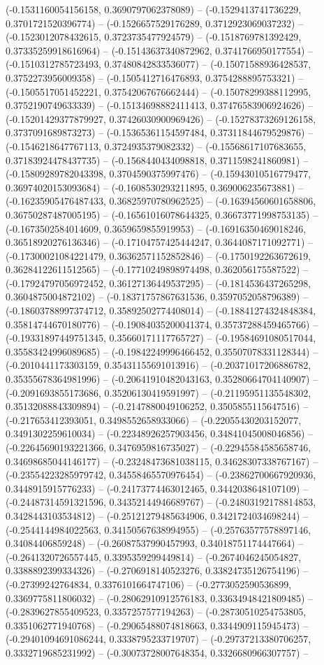 (-0.1531160054156158, 0.3690797062378089) -- (-0.1529413741736229, 0.3701721520396774) -- (-0.1526657529176289, 0.3712923069037232) -- (-0.1523012078432615, 0.3723735477924579) -- (-0.1518769781392429, 0.37335259918616964) -- (-0.15143637340872962, 0.3741766950177554) -- (-0.1510312785723493, 0.37480842833536077) -- (-0.15071588936428537, 0.3752273956009358) -- (-0.1505412716476893, 0.3754288895753321) -- (-0.1505517051452221, 0.37542067676662444) -- (-0.15078299388112995, 0.3752190749633339) -- (-0.15134698882411413, 0.37476583906924626) -- (-0.15201429377879927, 0.37426030900969426) -- (-0.15278373269126158, 0.3737091689873273) -- (-0.15365361154597484, 0.37311844679529876) -- (-0.1546218647767113, 0.3724935379082332) -- (-0.15568617107683655, 0.37183924478437735) -- (-0.1568440434098818, 0.3711598241860981) -- (-0.15809289782043398, 0.3704590375997476) -- (-0.15943010516779477, 0.36974020153093684) -- (-0.1608530293211895, 0.369006235673881) -- (-0.16235905476487433, 0.36825970780962525) -- (-0.16394560601658806, 0.36750287487005195) -- (-0.16561016078644325, 0.36673771998753135) -- (-0.1673502584014609, 0.3659659855919953) -- (-0.16916350469018246, 0.36518920276136346) -- (-0.17104757425444247, 0.3644087171092771) -- (-0.17300021084221479, 0.36362571152852846) -- (-0.1750192263672619, 0.36284122611512565) -- (-0.17710249898974498, 0.362056175587522) -- (-0.17924797056972452, 0.36127136449537295) -- (-0.1814536437265298, 0.3604875004872102) -- (-0.18371757867631536, 0.3597052058796389) -- (-0.18603788997374712, 0.35892502774408014) -- (-0.18841274324848384, 0.35814744670180776) -- (-0.19084035200041374, 0.35737288459465766) -- (-0.19331897449751345, 0.35660171117765727) -- (-0.19584691080517044, 0.35583424996089685) -- (-0.19842249996466452, 0.35507078331128344) -- (-0.2010441173303159, 0.35431155691013916) -- (-0.20371017206886782, 0.35355678364981996) -- (-0.20641910482043163, 0.35280664704140907) -- (-0.2091693855173686, 0.35206130419591997) -- (-0.21195951135548302, 0.35132088843309894) -- (-0.2147880049106252, 0.3505855115647516) -- (-0.217653412393051, 0.3498552658933066) -- (-0.22055430203152077, 0.3491302259610034) -- (-0.22348926257903456, 0.34841045008046856) -- (-0.22645690193221366, 0.3476959816735027) -- (-0.22945584585658746, 0.34698685044146177) -- (-0.23248473681038115, 0.34628307338767167) -- (-0.23554223285979742, 0.34558465570976454) -- (-0.23862700667920936, 0.3448915915776233) -- (-0.24173774463012465, 0.3442038648107109) -- (-0.24487314591321596, 0.34352144946689767) -- (-0.24803192178814853, 0.3428443103534812) -- (-0.25121279485634906, 0.3421724034698244) -- (-0.2544144984022563, 0.34150567638994955) -- (-0.25763577578897146, 0.34084406859248) -- (-0.26087537990457993, 0.34018751174447664) -- (-0.2641320726557445, 0.3395359299449814) -- (-0.2674046245054827, 0.3388892399334326) -- (-0.2706918140523276, 0.33824735126754196) -- (-0.27399242764834, 0.3376101664747106) -- (-0.2773052590536899, 0.3369775811806032) -- (-0.28062910912576183, 0.33634948421809485) -- (-0.2839627855409523, 0.3357257577194263) -- (-0.28730510254753805, 0.3351062771940768) -- (-0.29065488074818663, 0.3344909115945473) -- (-0.29401094691086244, 0.3338795233719707) -- (-0.29737213380706257, 0.3332719685231992) -- (-0.30073728007648354, 0.3326680966307757) -- 